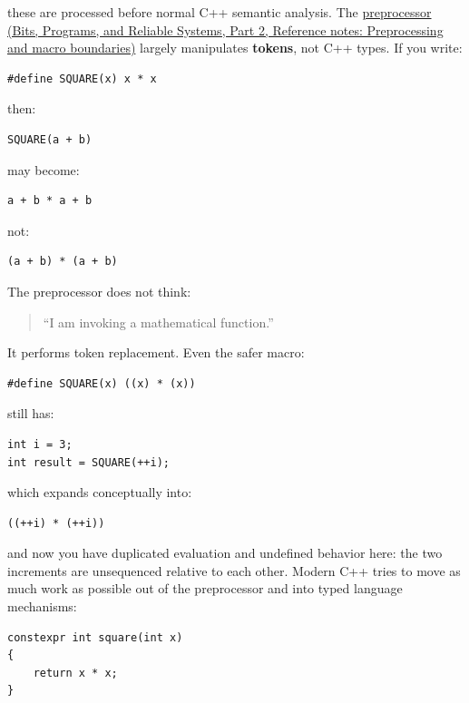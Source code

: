 these are processed before normal C++ semantic analysis. The \href{../01-Bits-Programs-and-Reliable-Systems-P02/main.pdf\#appendix-33c0a92ce855}{preprocessor (Bits, Programs, and Reliable Systems, Part 2, Reference notes: Preprocessing and macro boundaries)} largely manipulates \textbf{tokens}, not C++ types. If you write:

\begin{verbatim}
#define SQUARE(x) x * x
\end{verbatim}

then:

\begin{verbatim}
SQUARE(a + b)
\end{verbatim}

may become:

\begin{verbatim}
a + b * a + b
\end{verbatim}

not:

\begin{verbatim}
(a + b) * (a + b)
\end{verbatim}

The preprocessor does not think:

\begin{quote}
``I am invoking a mathematical function.''
\end{quote}

It performs token replacement. Even the safer macro:

\begin{verbatim}
#define SQUARE(x) ((x) * (x))
\end{verbatim}

still has:

\begin{verbatim}
int i = 3;
int result = SQUARE(++i);
\end{verbatim}

which expands conceptually into:

\begin{verbatim}
((++i) * (++i))
\end{verbatim}

and now you have duplicated evaluation and undefined behavior here: the two increments are unsequenced relative to each other. Modern C++ tries to move as much work as possible out of the preprocessor and into typed language mechanisms:

\begin{verbatim}
constexpr int square(int x)
{
    return x * x;
}
\end{verbatim}

